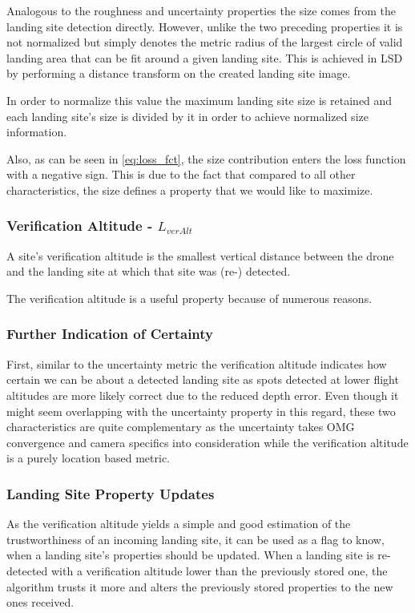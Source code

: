 Analogous to the roughness and uncertainty properties the size comes from the landing site detection directly. However, unlike the two preceding properties it is not normalized but simply denotes the metric radius of the largest circle of valid landing area that can be fit around a given landing site. This is achieved in LSD by performing a distance transform on the created landing site image.

In order to normalize this value the maximum landing site size is retained and each landing site's size is divided by it in order to achieve normalized size information.

Also, as can be seen in \cref{eq:loss_fct}, the size contribution enters the loss function with a negative sign. This is due to the fact that compared to all other characteristics, the size defines a property that we would like to maximize.

\subsubsection{Verification Altitude - $L_{verAlt}$}\label{subsubsec:ver_alt}

A site's verification altitude is the smallest vertical distance between the drone and the landing site at which that site was (re-) detected. 

The verification altitude is a useful property because of numerous reasons.
\subsubsection{Further Indication of Certainty}
First, similar to the uncertainty metric the verification altitude indicates how certain we can be about a detected landing site as spots detected at lower flight altitudes are more likely correct due to the reduced depth error. Even though it might seem overlapping with the uncertainty property in this regard, these two characteristics are quite complementary as the uncertainty takes OMG convergence and camera specifics into consideration while the verification altitude is a purely location based metric.

\subsubsection{Landing Site Property Updates}
As the verification altitude yields a simple and good estimation of the trustworthiness of an incoming landing site, it can be used as a flag to know, when a landing site's properties should be updated. When a landing site is re-detected with a verification altitude lower than the previously stored one, the algorithm trusts it more and alters the previously stored properties to the new ones received.

